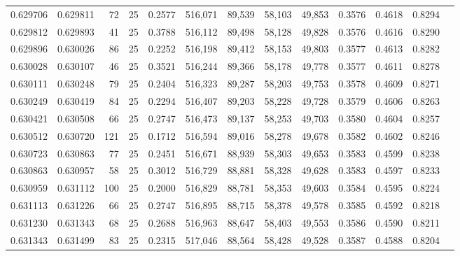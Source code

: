 \begin{tabular}{rrrrrrrrrrrrr}
0.629706 & 0.629811 &    72 &  25 &                                     0.2577 & 516,071 &  89,539 &  58,103 &  49,853 & 0.3576 & 0.4618 & 0.8294 \\
0.629812 & 0.629893 &    41 &  25 &                                     0.3788 & 516,112 &  89,498 &  58,128 &  49,828 & 0.3576 & 0.4616 & 0.8290 \\
0.629896 & 0.630026 &    86 &  25 &                                     0.2252 & 516,198 &  89,412 &  58,153 &  49,803 & 0.3577 & 0.4613 & 0.8282 \\
0.630028 & 0.630107 &    46 &  25 &                                     0.3521 & 516,244 &  89,366 &  58,178 &  49,778 & 0.3577 & 0.4611 & 0.8278 \\
0.630111 & 0.630248 &    79 &  25 &                                     0.2404 & 516,323 &  89,287 &  58,203 &  49,753 & 0.3578 & 0.4609 & 0.8271 \\
0.630249 & 0.630419 &    84 &  25 &                                     0.2294 & 516,407 &  89,203 &  58,228 &  49,728 & 0.3579 & 0.4606 & 0.8263 \\
0.630421 & 0.630508 &    66 &  25 &                                     0.2747 & 516,473 &  89,137 &  58,253 &  49,703 & 0.3580 & 0.4604 & 0.8257 \\
0.630512 & 0.630720 &   121 &  25 &                                     0.1712 & 516,594 &  89,016 &  58,278 &  49,678 & 0.3582 & 0.4602 & 0.8246 \\
0.630723 & 0.630863 &    77 &  25 &                                     0.2451 & 516,671 &  88,939 &  58,303 &  49,653 & 0.3583 & 0.4599 & 0.8238 \\
0.630863 & 0.630957 &    58 &  25 &                                     0.3012 & 516,729 &  88,881 &  58,328 &  49,628 & 0.3583 & 0.4597 & 0.8233 \\
0.630959 & 0.631112 &   100 &  25 &                                     0.2000 & 516,829 &  88,781 &  58,353 &  49,603 & 0.3584 & 0.4595 & 0.8224 \\
0.631113 & 0.631226 &    66 &  25 &                                     0.2747 & 516,895 &  88,715 &  58,378 &  49,578 & 0.3585 & 0.4592 & 0.8218 \\
0.631230 & 0.631343 &    68 &  25 &                                     0.2688 & 516,963 &  88,647 &  58,403 &  49,553 & 0.3586 & 0.4590 & 0.8211 \\
0.631343 & 0.631499 &    83 &  25 &                                     0.2315 & 517,046 &  88,564 &  58,428 &  49,528 & 0.3587 & 0.4588 & 0.8204 \\

\end{tabular}
